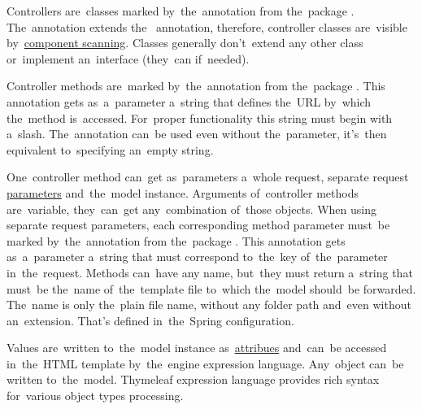 \noindent Controllers are~classes marked by~the~annotation  from the~package .
The~annotation extends the~ annotation, therefore, controller classes are~visible by~\hyperref[iocannotations]{component scanning}.
Classes generally don't~extend any other class or~implement an~interface (they~can if~needed).

Controller methods are~marked by~the~annotation  from the~package .
This annotation gets as~a~parameter a~string that defines the~URL by~which the~method is~accessed.
For~proper functionality this string must begin with a~slash.
The~annotation can~be used even without the~parameter, it's~then equivalent to~specifying an~empty string.

One~controller method can~get as~parameters a~whole request, separate request \hyperref[jspattributeparameter]{parameters} and~the~model instance.
Arguments of~controller methods are~variable, they~can~get any~combination of~those objects.
When using separate request parameters, each corresponding method parameter must~be marked by~the~annotation  from the~package .
This annotation gets as~a~parameter a~string that must correspond to~the~key of~the~parameter in~the~request.
Methods can~have any name, but~they must return a~string that must~be the~name of~the~template file to~which the~model should~be forwarded.
The~name is only the~plain file name, without any folder path and~even without an~extension.
That's defined in~the~Spring configuration.

Values are~written to~the~model instance as~\hyperref[jspattributeparameter]{attribues} and~can~be accessed in~the~HTML template by~the~engine expression language.
Any~object can~be written to~the~model.
Thymeleaf expression language provides rich syntax for~various object types processing.
\newpage

